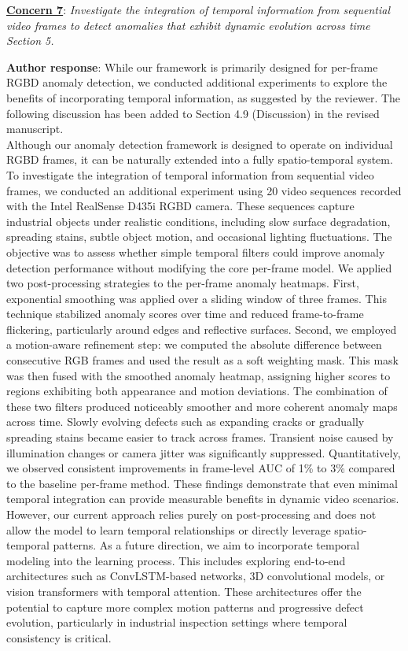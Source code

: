 \documentclass[a4paper,fleqnn]{cas-sc}
\begin{document}
\vspace{1em}

\noindent \textbf{\underline{Concern 7}}: \textit{Investigate the integration of temporal information from sequential video frames to detect anomalies that exhibit dynamic evolution across time Section 5. \\}

\noindent \textbf{Author response}:  While our framework is primarily designed for per-frame RGBD anomaly detection, we conducted additional experiments to explore the benefits of incorporating temporal information, as suggested by the reviewer. The following discussion has been added to Section 4.9 (Discussion) in the revised manuscript. \\

Although our anomaly detection framework is designed to operate on individual RGBD frames, it can be naturally extended into a fully spatio-temporal system. To investigate the integration of temporal information from sequential video frames, we conducted an additional experiment using 20 video sequences recorded with the Intel RealSense D435i RGBD camera. These sequences capture industrial objects under realistic conditions, including slow surface degradation, spreading stains, subtle object motion, and occasional lighting fluctuations. The objective was to assess whether simple temporal filters could improve anomaly detection performance without modifying the core per-frame model. We applied two post-processing strategies to the per-frame anomaly heatmaps. First, exponential smoothing was applied over a sliding window of three frames. This technique stabilized anomaly scores over time and reduced frame-to-frame flickering, particularly around edges and reflective surfaces. Second, we employed a motion-aware refinement step: we computed the absolute difference between consecutive RGB frames and used the result as a soft weighting mask. This mask was then fused with the smoothed anomaly heatmap, assigning higher scores to regions exhibiting both appearance and motion deviations. The combination of these two filters produced noticeably smoother and more coherent anomaly maps across time. Slowly evolving defects such as expanding cracks or gradually spreading stains became easier to track across frames. Transient noise caused by illumination changes or camera jitter was significantly suppressed. Quantitatively, we observed consistent improvements in frame-level AUC of 1\% to 3\% compared to the baseline per-frame method. These findings demonstrate that even minimal temporal integration can provide measurable benefits in dynamic video scenarios. However, our current approach relies purely on post-processing and does not allow the model to learn temporal relationships or directly leverage spatio-temporal patterns. As a future direction, we aim to incorporate temporal modeling into the learning process. This includes exploring end-to-end architectures such as ConvLSTM-based networks, 3D convolutional models, or vision transformers with temporal attention. These architectures offer the potential to capture more complex motion patterns and progressive defect evolution, particularly in industrial inspection settings where temporal consistency is critical.
\end{document}
